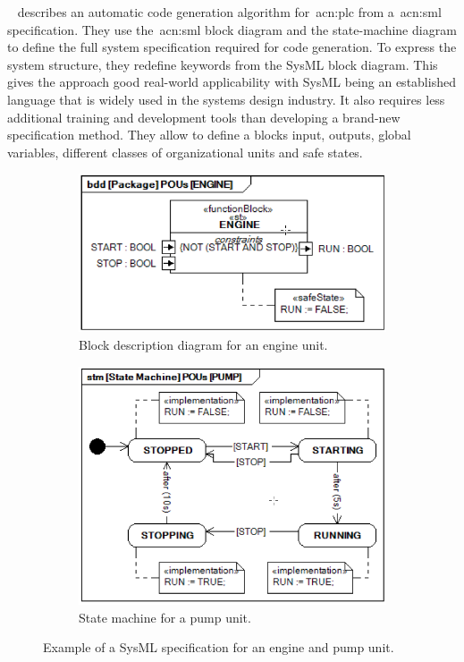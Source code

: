 \citeauthor{6957399}~\cite{6957399} describes an automatic code generation algorithm for~\acrshort{acn:plc} from a~\acrshort{acn:sml} specification.
They use the~\acrshort{acn:sml} block diagram and the state-machine diagram to define the full system specification required for code generation.
To express the system structure, they redefine keywords from the SysML block diagram.
This gives the approach good real-world applicability with SysML being an established language that is widely used in the systems design industry.
It also requires less additional training and development tools than developing a brand-new specification method.
They allow to define a blocks input, outputs, global variables, different classes of organizational units and safe states.
\begin{figure}[h]
	\begin{subfigure}{0.5\textwidth}
		\includegraphics[width=\textwidth]{./Figures/sysml_bdd.png}
		\caption{Block description diagram for an engine unit.}
		\label{fig:sysml:bdd}
	\end{subfigure}
	\begin{subfigure}{0.5\textwidth}
		\includegraphics[width=\textwidth]{./Figures/sysml_stm.png}
		\caption{State machine for a pump unit.}
		\label{fig:sysml:stm}
	\end{subfigure}
	\caption[Example of a SysML specification for an engine and pump unit.]{Example of a SysML specification for an engine and pump unit.~\cite{6957399}}
\end{figure}
